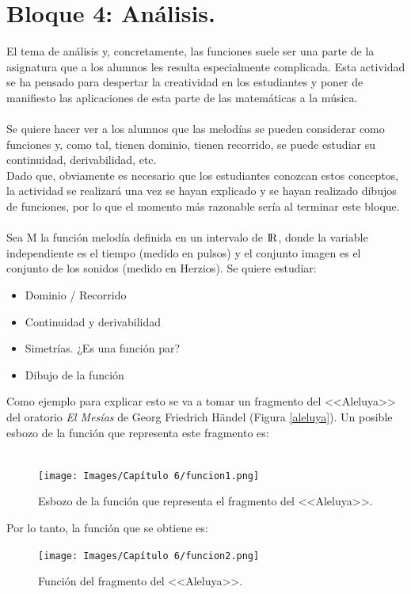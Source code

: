 \documentclass[a4paper, openright, 11pt, titlepage]{report}
\theoremstyle{definition}\newtheorem{defin}[propo]{Definition}
\theoremstyle{definition}\newtheorem{obser}[propo]{Remark}
\theoremstyle{definition}\newtheorem{ejem}[propo]{Ejemplo}
\theoremstyle{definition}\newtheorem{algoritmo}[propo]{Algoritmo}
\begin{document}
\section{Bloque 4: Análisis.}
El tema de análisis y, concretamente, las funciones suele ser una parte de la asignatura que a los alumnos les resulta especialmente complicada. Esta actividad se ha pensado para despertar la creatividad en los estudiantes y poner de manifiesto las aplicaciones de esta parte de las matemáticas a la música.\\\\
Se quiere hacer ver a los alumnos que las melodías se pueden considerar como funciones y, como tal, tienen dominio, tienen recorrido, se puede estudiar su continuidad, derivabilidad, etc. \\
Dado que, obviamente es necesario que los estudiantes conozcan estos conceptos, la actividad se realizará una vez se hayan explicado y se hayan realizado dibujos de funciones, por lo que el momento más razonable sería al terminar este bloque.\\\\
Sea M la función melodía definida en un intervalo de ${\rm I\!R}$, donde la variable independiente es el tiempo (medido en pulsos) y el conjunto imagen es el conjunto de los sonidos (medido en Herzios). Se quiere estudiar:
\begin{itemize}
    \item Dominio / Recorrido
    \item Continuidad y derivabilidad
    \item Simetrías. ¿Es una función par?
    \item Dibujo de la función
\end{itemize}
Como ejemplo para explicar esto se va a tomar un fragmento del <<Aleluya>> del oratorio \textit{El Mesías} de Georg Friedrich Händel (Figura \ref{aleluya}). Un posible esbozo de la función que representa este fragmento es:\\\\
\begin{figure}[H]
    \centering
    \texttt{[image: Images/Capítulo 6/funcion1.png]}
    \caption{Esbozo de la función que representa el fragmento del <<Aleluya>>.}
\end{figure}
Por lo tanto, la función que se obtiene es:
\begin{figure}[H]
    \centering
    \texttt{[image: Images/Capítulo 6/funcion2.png]}
    \caption{Función del fragmento del <<Aleluya>>.}
    \label{funcion}
\end{figure}
\end{document}

